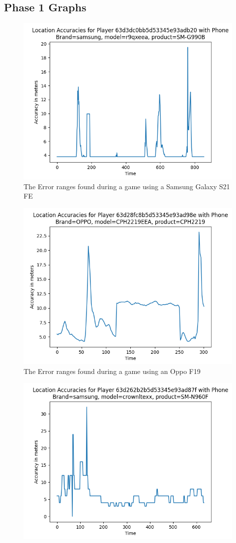 \documentclass{l4proj}
\begin{document}
\begin{appendices}

\chapter{Phase 1 Graphs}

\begin{figure}
    \centering
    \includegraphics[width=0.8\linewidth]{images/my_phone.png} 
    \caption{The Error ranges found during a game using a Samsung Galaxy S21 FE}
    \label{fig:galaxys21}
\end{figure}
\begin{figure}
    \centering
    \includegraphics[width=0.8\linewidth]{images/oppo.png}
    \caption{The Error ranges found during a game using an Oppo F19}
    \label{fig:oppo}
\end{figure}
\begin{figure}
    \centering
    \includegraphics[width=0.8\linewidth]{images/note9.png}

\end{figure}
\end{appendices}
\end{document}
